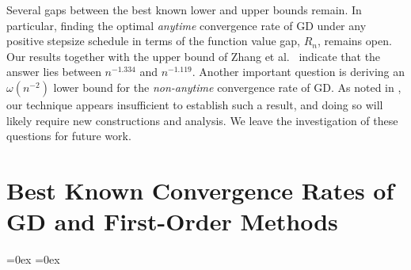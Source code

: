 \documentclass[11pt]{article}
\begin{document}
Several gaps between the best known lower and upper bounds remain.
In particular, finding the optimal \textit{anytime} convergence rate of GD under any positive stepsize schedule in terms of the function value gap, $R_n$, remains open.
Our results together with the upper bound of Zhang et al.~\cite{zhang:2025} indicate that the answer lies between $n^{-1.334}$ and $n^{-1.119}.$
Another important question is deriving an $\omega(n^{-2})$ lower bound for the \textit{non-anytime} convergence rate of GD.
As noted in , our technique appears insufficient to establish such a result, and doing so will likely require new constructions and analysis. We leave the investigation of these questions for future work.








\newpage
\appendix

\section{Best Known Convergence Rates of GD and First-Order Methods}\label{sec:sota_results}

\aboverulesep=0ex
\belowrulesep=0ex
\end{document}
